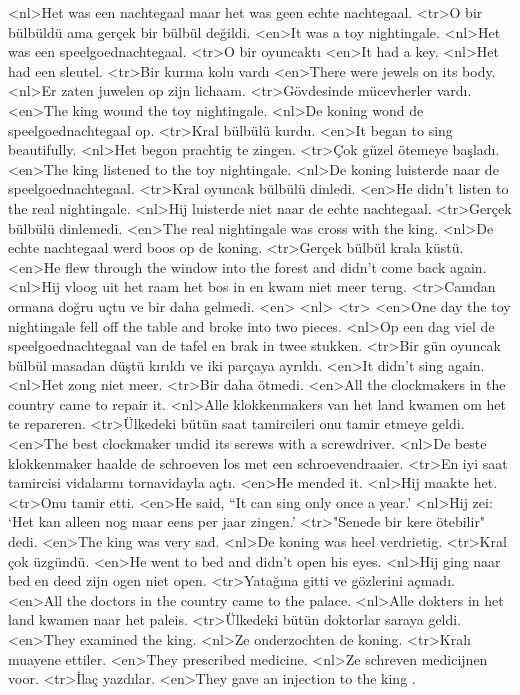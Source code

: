 <nl>Het was een nachtegaal maar het was geen echte nachtegaal.
<tr>O bir bülbüldü ama gerçek bir bülbül değildi.
<en>It was a toy nightingale.
<nl>Het was een speelgoednachtegaal.
<tr>O bir oyuncaktı
<en>It had a key.
<nl>Het had een sleutel.
<tr>Bir kurma kolu vardı
<en>There were jewels on its body.
<nl>Er zaten juwelen op zijn lichaam.
<tr>Gövdesinde mücevherler vardı.
<en>The king wound the toy nightingale.
<nl>De koning wond de speelgoednachtegaal op.
<tr>Kral bülbülü kurdu.
<en>It began to sing beautifully.
<nl>Het begon prachtig te zingen.
<tr>Çok güzel ötemeye başladı.
<en>The king listened to the toy nightingale.
<nl>De koning luisterde naar de speelgoednachtegaal. 
<tr>Kral oyuncak bülbülü dinledi.
<en>He didn’t listen to the real nightingale.
<nl>Hij luisterde niet naar de echte nachtegaal.
<tr>Gerçek bülbülü dinlemedi.
<en>The real nightingale was cross with the king.
<nl>De echte nachtegaal werd boos op de koning.
<tr>Gerçek bülbül krala küstü.
<en>He flew through the window into the forest and didn’t come back again.
<nl>Hij vloog uit het raam het bos in en kwam niet meer terug.
<tr>Camdan ormana doğru uçtu ve bir daha gelmedi.
<en>
<nl>
<tr>
<en>One day the toy nightingale fell off the table and broke into two pieces.
<nl>Op een dag viel de speelgoednachtegaal van de tafel en brak in twee stukken.
<tr>Bir gün oyuncak bülbül masadan düştü kırıldı ve iki parçaya ayrıldı.
<en>It didn’t sing again.
<nl>Het zong niet meer.
<tr>Bir daha ötmedi.
<en>All the clockmakers in the country came to repair it. 
<nl>Alle klokkenmakers van het land kwamen om het te repareren. 
<tr>Ülkedeki bütün saat tamircileri onu tamir etmeye geldi.
<en>The best clockmaker undid its screws with a screwdriver.
<nl>De beste klokkenmaker haalde de schroeven los met een schroevendraaier.
<tr>En iyi saat tamircisi vidalarını tornavidayla açtı.
<en>He mended it.
<nl>Hij maakte het. 
<tr>Onu tamir etti.
<en>He said, “It can sing only once a year.'
<nl>Hij zei: `Het kan alleen nog maar eens per jaar zingen.'
<tr>"Senede bir kere ötebilir" dedi.
<en>The king was very sad.
<nl>De koning was heel verdrietig.
<tr>Kral çok üzgündü.
<en>He went to bed and didn’t open his eyes.
<nl>Hij ging naar bed en deed zijn ogen niet open.
<tr>Yatağına gitti ve gözlerini açmadı.
<en>All the doctors in the country came to the palace.
<nl>Alle dokters in het land kwamen naar het paleis.
<tr>Ülkedeki bütün doktorlar saraya geldi.
<en>They examined the king.
<nl>Ze onderzochten de koning.
<tr>Kralı muayene ettiler.
<en>They prescribed medicine.
<nl>Ze schreven  medicijnen voor.
<tr>İlaç yazdılar.
<en>They gave an injection to the king .
